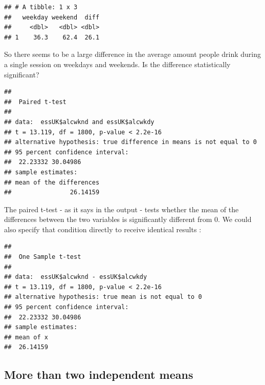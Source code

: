 \documentclass[
]{book}
\newenvironment{Shaded}{\begin{snugshade}}{\end{snugshade}}
\newcommand{\DataTypeTok}[1]{\textcolor[rgb]{0.13,0.29,0.53}{#1}}
\newcommand{\DecValTok}[1]{\textcolor[rgb]{0.00,0.00,0.81}{#1}}
\newcommand{\KeywordTok}[1]{\textcolor[rgb]{0.13,0.29,0.53}{\textbf{#1}}}
\newcommand{\NormalTok}[1]{#1}
\newcommand{\OperatorTok}[1]{\textcolor[rgb]{0.81,0.36,0.00}{\textbf{#1}}}
\newcommand{\OtherTok}[1]{\textcolor[rgb]{0.56,0.35,0.01}{#1}}
\newcommand{\StringTok}[1]{\textcolor[rgb]{0.31,0.60,0.02}{#1}}
\begin{document}
\begin{verbatim}
## # A tibble: 1 x 3
##   weekday weekend  diff
##     <dbl>   <dbl> <dbl>
## 1    36.3    62.4  26.1
\end{verbatim}

So there seems to be a large difference in the average amount people drink during a single session on weekdays and weekends. Is the difference statistically significant?

\begin{Shaded}
\end{Shaded}

\begin{verbatim}
## 
## 	Paired t-test
## 
## data:  essUK$alcwknd and essUK$alcwkdy
## t = 13.119, df = 1800, p-value < 2.2e-16
## alternative hypothesis: true difference in means is not equal to 0
## 95 percent confidence interval:
##  22.23332 30.04986
## sample estimates:
## mean of the differences 
##                26.14159
\end{verbatim}

The paired t-test - as it says in the output - tests whether the mean of the differences between the two variables is significantly different from 0. We could also specify that condition directly to receive identical results :

\begin{Shaded}
\end{Shaded}

\begin{verbatim}
## 
## 	One Sample t-test
## 
## data:  essUK$alcwknd - essUK$alcwkdy
## t = 13.119, df = 1800, p-value < 2.2e-16
## alternative hypothesis: true mean is not equal to 0
## 95 percent confidence interval:
##  22.23332 30.04986
## sample estimates:
## mean of x 
##  26.14159
\end{verbatim}

\hypertarget{more-than-two-independent-means}{%
\subsection{More than two independent means}\label{more-than-two-independent-means}}
\end{document}
